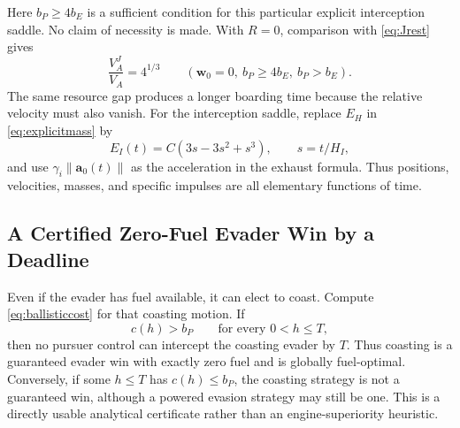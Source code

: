 \documentclass[journal,a4paper]{IEEEtran}
\newcommand{\norm}[1]{\left\|#1\right\|}
\begin{document}
Here $b_P\ge4b_E$ is a sufficient condition for this particular explicit interception saddle. No claim of necessity is made. With $R=0$, comparison with \eqref{eq:Jrest} gives
\begin{equation}
 \frac{V_A^J}{V_A}=4^{1/3}
 \qquad(\mathbf w_0=0,\ b_P\ge4b_E,\ b_P>b_E).
 \label{eq:boardingpenalty}
\end{equation}
The same resource gap produces a longer boarding time because the relative velocity must also vanish. For the interception saddle, replace $E_H$ in \eqref{eq:explicitmass} by
\begin{equation}
 E_I(t)=C(3s-3s^2+s^3),\qquad s=t/H_I,
\end{equation}
and use $\gamma_i\norm{\mathbf a_0(t)}$ as the acceleration in the exhaust formula. Thus positions, velocities, masses, and specific impulses are all elementary functions of time.

\subsection{A Certified Zero-Fuel Evader Win by a Deadline}
Even if the evader has fuel available, it can elect to coast. Compute \eqref{eq:ballisticcost} for that coasting motion. If
\begin{equation}
 c(h)>b_P\qquad\text{for every }0<h\le T,
 \label{eq:coastwin}
\end{equation}
then no pursuer control can intercept the coasting evader by $T$. Thus coasting is a guaranteed evader win with exactly zero fuel and is globally fuel-optimal. Conversely, if some $h\le T$ has $c(h)\le b_P$, the coasting strategy is not a guaranteed win, although a powered evasion strategy may still be one. This is a directly usable analytical certificate rather than an engine-superiority heuristic.
\end{document}
